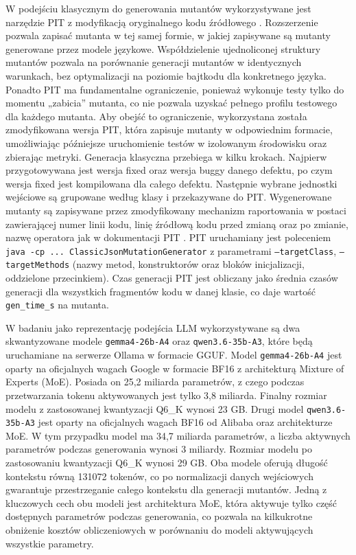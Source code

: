 \documentclass[12pt,a4paper,oldfontcommands]{memoir}
\theoremstyle{plain}
\theoremstyle{definition}
\theoremstyle{remark}
\begin{document}
    W podejściu klasycznym do generowania mutantów wykorzystywane jest narzędzie PIT z modyfikacją oryginalnego kodu źródłowego \cite{ref7}.
    Rozszerzenie pozwala zapisać mutanta w tej samej formie, w jakiej zapisywane są mutanty generowane przez modele językowe.
    Współdzielenie ujednoliconej struktury mutantów pozwala na porównanie generacji mutantów w identycznych warunkach, bez optymalizacji na poziomie bajtkodu dla konkretnego języka.
    Ponadto PIT ma fundamentalne ograniczenie, ponieważ wykonuje testy tylko do momentu „zabicia” mutanta, co nie pozwala uzyskać pełnego profilu testowego dla każdego mutanta.
    Aby obejść to ograniczenie, wykorzystana została zmodyfikowana wersja PIT, która zapisuje mutanty w odpowiednim formacie, umożliwiając późniejsze uruchomienie testów w izolowanym środowisku oraz zbierając metryki.
    Generacja klasyczna przebiega w kilku krokach.
    Najpierw przygotowywana jest wersja fixed oraz wersja buggy danego defektu, po czym wersja fixed jest kompilowana dla całego defektu.
    Następnie wybrane jednostki wejściowe są grupowane według klasy i przekazywane do PIT.
    Wygenerowane mutanty są zapisywane przez zmodyfikowany mechanizm raportowania w postaci zawierającej numer linii kodu, linię źródłową kodu przed zmianą oraz po zmianie, nazwę operatora jak w dokumentacji PIT \cite{ref1}.
    PIT uruchamiany jest poleceniem \texttt{java -cp ... ClassicJsonMutationGenerator} z parametrami \texttt{--targetClass}, \texttt{--targetMethods} (nazwy metod, konstruktorów oraz bloków inicjalizacji, oddzielone przecinkiem).
    Czas generacji PIT jest obliczany jako średnia czasów generacji dla wszystkich fragmentów kodu w danej klasie, co daje wartość \texttt{gen\_time\_s} na mutanta.

    W badaniu jako reprezentację podejścia LLM wykorzystywane są dwa skwantyzowane modele \texttt{gemma4-26b-A4} oraz \texttt{qwen3.6-35b-A3}, które będą uruchamiane na serwerze Ollama w formacie GGUF.
    Model \texttt{gemma4-26b-A4} jest oparty na oficjalnych wagach Google w formacie BF16 z architekturą Mixture of Experts (MoE).
    Posiada on 25,2 miliarda parametrów, z czego podczas przetwarzania tokenu aktywowanych jest tylko 3,8 miliarda.
    Finalny rozmiar modelu z zastosowanej kwantyzacji Q6\_K wynosi 23 GB.
    Drugi model \texttt{qwen3.6-35b-A3} jest oparty na oficjalnych wagach BF16 od Alibaba oraz architekturze MoE.
    W tym przypadku model ma 34,7 miliarda parametrów, a liczba aktywnych parametrów podczas generowania wynosi 3 miliardy.
    Rozmiar modelu po zastosowaniu kwantyzacji Q6\_K wynosi 29 GB.
    Oba modele oferują długość kontekstu równą 131072 tokenów, co po normalizacji danych wejściowych gwarantuje przestrzeganie całego kontekstu dla generacji mutantów.
    Jedną z kluczowych cech obu modeli jest architektura MoE, która aktywuje tylko część dostępnych parametrów podczas generowania, co pozwala na kilkukrotne obniżenie kosztów obliczeniowych w porównaniu do modeli aktywujących wszystkie parametry.
\end{document}
